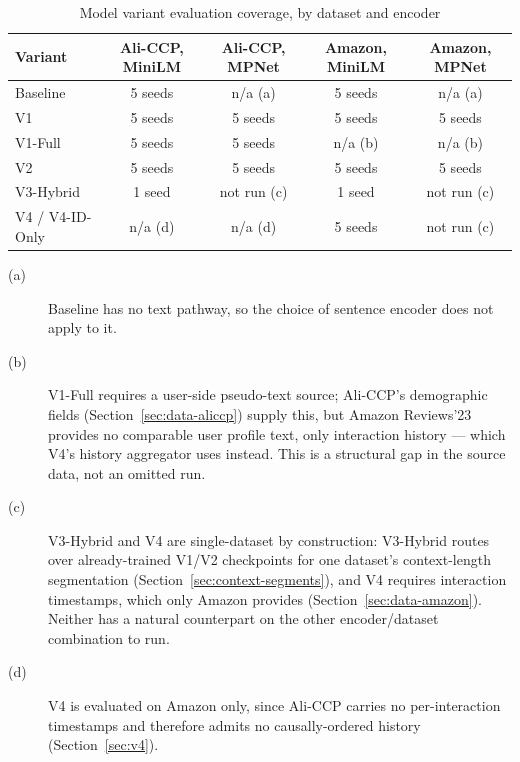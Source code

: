\begin{table}[h]
\centering
\caption{Model variant evaluation coverage, by dataset and encoder}
\label{tab:variant-coverage}
\begin{tabular}{lcccc}
\toprule
Variant & Ali-CCP, MiniLM & Ali-CCP, MPNet & Amazon, MiniLM & Amazon, MPNet \\
\midrule
Baseline   & 5 seeds & n/a (a) & 5 seeds & n/a (a) \\
V1         & 5 seeds & 5 seeds & 5 seeds & 5 seeds \\
V1-Full    & 5 seeds & 5 seeds & n/a (b) & n/a (b) \\
V2         & 5 seeds & 5 seeds & 5 seeds & 5 seeds \\
V3-Hybrid  & 1 seed & not run (c) & 1 seed & not run (c) \\
V4 / V4-ID-Only & n/a (d) & n/a (d) & 5 seeds & not run (c) \\
\bottomrule
\end{tabular}
\end{table}

\begin{description}
  \item[(a)] Baseline has no text pathway, so the choice of sentence encoder does not apply to it.
  \item[(b)] V1-Full requires a user-side pseudo-text source; Ali-CCP's demographic fields (Section~\ref{sec:data-aliccp}) supply this, but Amazon Reviews'23 provides no comparable user profile text, only interaction history --- which V4's history aggregator uses instead. This is a structural gap in the source data, not an omitted run.
  \item[(c)] V3-Hybrid and V4 are single-dataset by construction: V3-Hybrid routes over already-trained V1/V2 checkpoints for one dataset's context-length segmentation (Section~\ref{sec:context-segments}), and V4 requires interaction timestamps, which only Amazon provides (Section~\ref{sec:data-amazon}). Neither has a natural counterpart on the other encoder/dataset combination to run.
  \item[(d)] V4 is evaluated on Amazon only, since Ali-CCP carries no per-interaction timestamps and therefore admits no causally-ordered history (Section~\ref{sec:v4}).
\end{description}

